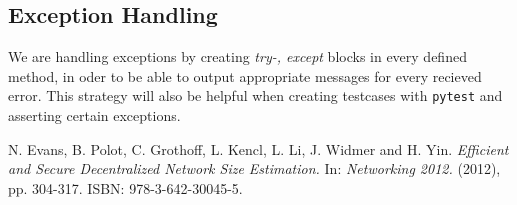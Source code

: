 \documentclass[IN,11pt,twoside,openright,english]{article}
\begin{document}
\subsection{Exception Handling}
We are handling exceptions by creating \textit{try-, except} blocks in every defined method, in oder to be able to output appropriate messages for every recieved error. This strategy will also be helpful when creating testcases with \texttt{pytest} and asserting certain exceptions.


\begin{thebibliography}{9}

N. Evans, B. Polot, C. Grothoff, L. Kencl, L. Li, J. Widmer and H. Yin. {\em Efficient and Secure Decentralized Network Size Estimation.} In: {\em Networking 2012.} (2012), pp. 304-317. ISBN: 978-3-642-30045-5.

\end{thebibliography}
\end{document}
